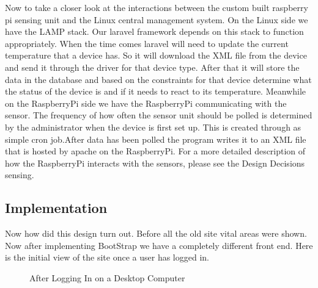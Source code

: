 \documentclass{report}
\begin{document}
\indent
Now to take a closer look at the interactions between the custom built raspberry pi sensing unit and the Linux central management system. On the Linux side we have the LAMP stack. Our laravel framework depends on this stack to function appropriately. When the time comes laravel will need to update the current temperature that a device has. So it will download the XML file from the device and send it through the driver for that device type. After that it will store the data in the database and based on the constraints for that device determine what the status of the device is and if it needs to react to its temperature. 
\newline
\indent
Meanwhile on the RaspberryPi side we have the RaspberryPi communicating with the sensor. The frequency of how often the sensor unit should be polled is determined by the administrator when the device is first set up. This is created through as simple cron job.After data has been polled the program writes it to an XML file that is hosted by apache on the RaspberryPi. For a more detailed description of how the RaspberryPi interacts with the sensors, please see the Design Decisions sensing.
\newpage

\subsection*{Implementation}
\indent
\indent
Now how did this design turn out. Before all the old site vital areas were shown. Now after implementing BootStrap we have a completely different front end. Here is the initial view of the site once a user has logged in.
\begin{figure}[H]
	\caption{After Logging In on a Desktop Computer}
\end{figure}
\newpage
\end{document}
